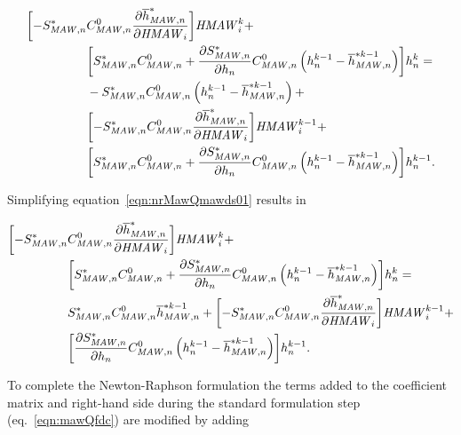 \begin{equation}
	\label{eqn:nrMawQmawds01}
	\begin{aligned}
		\biggl[ -S_{\mathit{MAW},n}^* &C_{\mathit{MAW},n}^0 \frac{\partial \overline{h}^*_{\mathit{MAW},n}}{{\partial \mathit{HMAW}_i}}
 \biggr] \mathit{HMAW}_i^k + \\
 		&\biggl[ S_{\mathit{MAW},n}^* C_{\mathit{MAW},n}^0 + \frac{\partial S_{\mathit{MAW},n}^*}{\partial h_n} C_{\mathit{MAW},n}^0 \left( h_n^{k-1} - \overline{h}_{\mathit{MAW},n}^{*k-1} \right) \biggr]  h^k_n = \\
		&-S_{\mathit{MAW},n}^* C_{\mathit{MAW},n}^0 \left( h_n^{k-1} - \overline{h}_{\mathit{MAW},n}^{*k-1} \right) + \\
		&\biggl[ -S_{\mathit{MAW},n}^* C_{\mathit{MAW},n}^0 \frac{\partial \overline{h}^*_{\mathit{MAW},n}}{{\partial \mathit{HMAW}_i}}
 \biggr] \mathit{HMAW}_i^{k-1} + \\
 		&\biggl[ S_{\mathit{MAW},n}^* C_{\mathit{MAW},n}^0 + \frac{\partial S_{\mathit{MAW},n}^*}{\partial h_n} C_{\mathit{MAW},n}^0 \left( h_n^{k-1} - \overline{h}_{\mathit{MAW},n}^{*k-1} \right) \biggr]  h^{k-1}_n .
	\end{aligned}
\end{equation}

\noindent Simplifying equation~\ref{eqn:nrMawQmawds01} results in

\begin{equation}
	\label{eqn:nrMawQmawds02}
	\begin{aligned}
		\biggl[ -S_{\mathit{MAW},n}^* &C_{\mathit{MAW},n}^0 \frac{\partial \overline{h}^*_{\mathit{MAW},n}}{{\partial \mathit{HMAW}_i}}
 \biggr] \mathit{HMAW}_i^k + \\
 		&\biggl[ S_{\mathit{MAW},n}^* C_{\mathit{MAW},n}^0 + \frac{\partial S_{\mathit{MAW},n}^*}{\partial h_n} C_{\mathit{MAW},n}^0 \left( h_n^{k-1} - \overline{h}_{\mathit{MAW},n}^{*k-1} \right) \biggr]  h^k_n = \\
		&S_{\mathit{MAW},n}^* C_{\mathit{MAW},n}^0 \overline{h}_{\mathit{MAW},n}^{*k-1} + \biggl[ -S_{\mathit{MAW},n}^* C_{\mathit{MAW},n}^0 \frac{\partial \overline{h}^*_{\mathit{MAW},n}}{{\partial \mathit{HMAW}_i}}
 \biggr] \mathit{HMAW}_i^{k-1} + \\
 		&\biggl[ \frac{\partial S_{\mathit{MAW},n}^*}{\partial h_n} C_{\mathit{MAW},n}^0 \left( h_n^{k-1} - \overline{h}_{\mathit{MAW},n}^{*k-1} \right) \biggr]  h^{k-1}_n .
	\end{aligned}
\end{equation}

\noindent To complete the Newton-Raphson formulation the terms added to the coefficient matrix and right-hand side during the standard formulation step (eq.~\ref{eqn:mawQfdc}) are modified by adding


